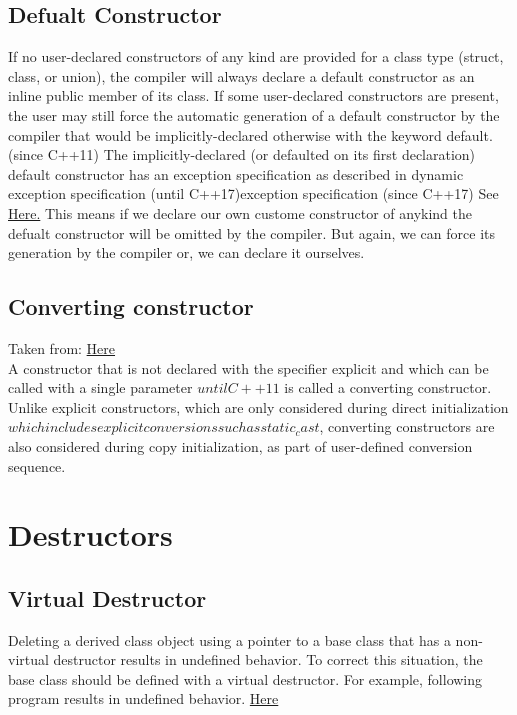 \documentclass[11pt,twoside,a4paper]{report}
\begin{document}
\subsection{Defualt Constructor}
If no user-declared constructors of any kind are provided for a class type (struct, class, or union), the compiler will always declare a default constructor as an inline public member of its class.
If some user-declared constructors are present, the user may still force the automatic generation of a default constructor by the compiler that would be implicitly-declared otherwise with the keyword default. (since C++11)
The implicitly-declared (or defaulted on its first declaration) default constructor has an exception specification as described in dynamic exception specification (until C++17)exception specification (since C++17)
See \href{https://en.cppreference.com/w/cpp/language/default_constructor}{Here.}
This means if we declare our own custome constructor of anykind the defualt constructor will be omitted by the compiler. But again, we can force its generation by the compiler or, we can declare it ourselves.


\subsection{Converting constructor}
Taken from: \href{https://en.cppreference.com/w/cpp/language/converting_constructor}{Here} \\
A constructor that is not declared with the specifier explicit and which can be called with a single parameter \(until C++11\) is called a converting constructor.
Unlike explicit constructors, which are only considered during direct initialization \(which includes explicit conversions such as static_cast\), converting constructors are also considered during copy initialization, as part of user-defined conversion sequence. 

\section{Destructors}
\subsection{Virtual Destructor}
Deleting a derived class object using a pointer to a base class that has a non-virtual destructor results in undefined behavior. To correct this situation, the base class should be defined with a virtual destructor.
For example, following program results in undefined behavior. \href{https://www.geeksforgeeks.org/virtual-destructor/}{Here}
\end{document}
